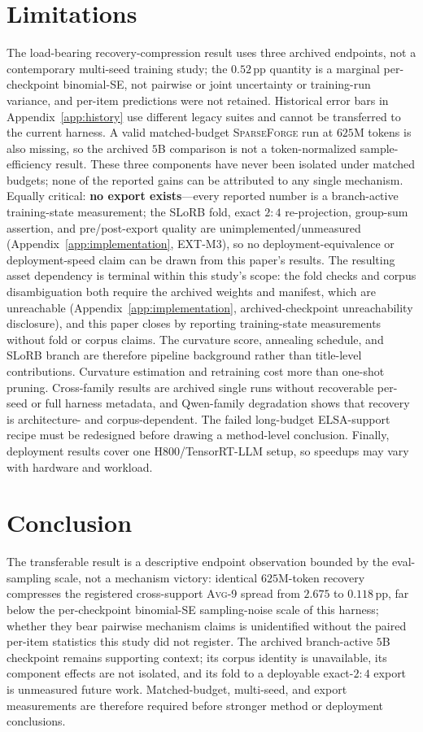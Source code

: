 \documentclass{article}
\newcommand{\method}{\textsc{SparseForge}}
\newcommand{\taskavg}{\textsc{Avg}-9}
\begin{document}
\section{Limitations}\label{sec:limitations}
The load-bearing recovery-compression result uses three archived endpoints, not a contemporary multi-seed training study; the $0.52$\,pp quantity is a marginal per-checkpoint binomial-SE, not pairwise or joint uncertainty or training-run variance, and per-item predictions were not retained. Historical error bars in Appendix~\ref{app:history} use different legacy suites and cannot be transferred to the current harness. A valid matched-budget \method{} run at $625$M tokens is also missing, so the archived $5$B comparison is not a token-normalized sample-efficiency result. These three components have never been isolated under matched budgets; none of the reported gains can be attributed to any single mechanism. Equally critical: \textbf{no export exists}---every reported number is a branch-active training-state measurement; the SLoRB fold, exact $2{:}4$ re-projection, group-sum assertion, and pre/post-export quality are unimplemented/unmeasured (Appendix~\ref{app:implementation}, EXT-M3), so no deployment-equivalence or deployment-speed claim can be drawn from this paper's results. The resulting asset dependency is terminal within this study's scope: the fold checks and corpus disambiguation both require the archived weights and manifest, which are unreachable (Appendix~\ref{app:implementation}, archived-checkpoint unreachability disclosure), and this paper closes by reporting training-state measurements without fold or corpus claims. The curvature score, annealing schedule, and SLoRB branch are therefore pipeline background rather than title-level contributions. Curvature estimation and retraining cost more than one-shot pruning. Cross-family results are archived single runs without recoverable per-seed or full harness metadata, and Qwen-family degradation shows that recovery is architecture- and corpus-dependent. The failed long-budget ELSA-support recipe must be redesigned before drawing a method-level conclusion. Finally, deployment results cover one H800/TensorRT-LLM setup, so speedups may vary with hardware and workload.

\section{Conclusion}\label{sec:conclusion}
The transferable result is a descriptive endpoint observation bounded by the eval-sampling scale, not a mechanism victory: identical $625$M-token recovery compresses the registered cross-support \taskavg{} spread from $2.675$ to $0.118$\,pp, far below the per-checkpoint binomial-SE sampling-noise scale of this harness; whether they bear pairwise mechanism claims is unidentified without the paired per-item statistics this study did not register. The archived branch-active $5$B checkpoint remains supporting context; its corpus identity is unavailable, its component effects are not isolated, and its fold to a deployable exact-$2{:}4$ export is unmeasured future work. Matched-budget, multi-seed, and export measurements are therefore required before stronger method or deployment conclusions.
\end{document}

